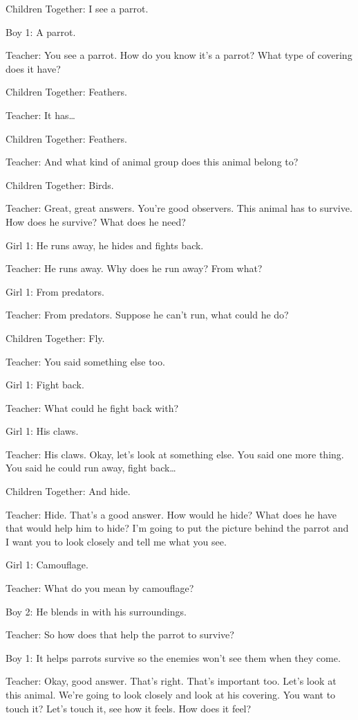 Children Together: I see a parrot.

Boy 1: A parrot.

Teacher: You see a parrot. How do you know it's a parrot? What type of covering does it have?

Children Together: Feathers.

Teacher: It has\dots

Children Together: Feathers.

Teacher: And what kind of animal group does this animal belong to?

Children Together: Birds.

Teacher: Great, great answers. You're good observers. This animal has to survive. How does he survive? What does he need?

Girl 1: He runs away, he hides and fights back.

Teacher: He runs away. Why does he run away? From what?

Girl 1: From predators.

Teacher: From predators. Suppose he can't run, what could he do?

Children Together: Fly.

Teacher: You said something else too.

Girl 1: Fight back.

Teacher: What could he fight back with?

Girl 1: His claws.

Teacher: His claws. Okay, let's look at something else. You said one more thing. You said he could run away, fight back\dots

Children Together: And hide.

Teacher: Hide. That's a good answer. How would he hide? What does he have that would help him to hide? I'm going to put the picture behind the parrot and I want you to look closely and tell me what you see.

Girl 1: Camouflage.

Teacher: What do you mean by camouflage?

Boy 2: He blends in with his surroundings.

Teacher: So how does that help the parrot to survive?

Boy 1: It helps parrots survive so the enemies won't see them when they come.

Teacher: Okay, good answer. That's right. That's important too. Let's look at this animal. We're going to look closely and look at his covering. You want to touch it? Let's touch it, see how it feels. How does it feel?

